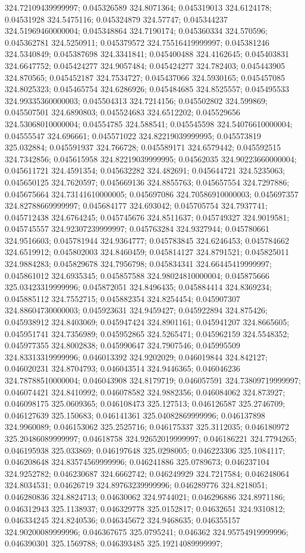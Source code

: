 324.72109439999997; 0.045326589 324.8071364; 0.045319013 324.6124178; 0.04531928 324.5475116; 0.045324879 324.57747; 0.045344237 324.51969460000004; 0.045348864 324.7190174; 0.045360334 324.570596; 0.045362781 324.5250911; 0.045379572 324.75516419999997; 0.045381246 324.5340849; 0.045387698 324.3341841; 0.045400488 324.4162645; 0.045403831 324.6647752; 0.045424277 324.9057484; 0.045424277 324.782403; 0.045443905 324.870565; 0.045452187 324.7534727; 0.045437066 324.5930165; 0.045457085 324.8025323; 0.045465754 324.6286926; 0.045484685 324.8525557; 0.045495533 324.99335360000003; 0.045504313 324.7214156; 0.045502802 324.599869; 0.045507501 324.6890803; 0.045524683 324.6512202; 0.045529656 324.53068010000004; 0.04554785 324.588541; 0.045545598 324.54076610000004; 0.04555547 324.696661; 0.045571022 324.82219039999995; 0.045573819 325.032884; 0.045591937 324.766728; 0.045589171 324.6579442; 0.045592515 324.7342856; 0.045615958 324.82219039999995; 0.04562035 324.90223660000004; 0.045611721 324.4591354; 0.045632282 324.482691; 0.045644721 324.5235063; 0.045650125 324.7620597; 0.045669136 324.8855763; 0.045657554 324.7297886; 0.045675664 324.73141610000005; 0.045697086 324.70586910000003; 0.045697357 324.82788669999997; 0.045684177 324.693042; 0.045705754 324.7937741; 0.045712438 324.6764245; 0.045745676 324.8511637; 0.045749327 324.9019581; 0.045745557 324.92307239999997; 0.045763284 324.9327944; 0.045780661 324.9516603; 0.045781944 324.9364777; 0.045783845 324.6246453; 0.045784662 324.6519912; 0.045802003 324.8460459; 0.045814127 324.8791521; 0.045825011 324.9884283; 0.045829678 324.7956798; 0.045834341 324.66445419999997; 0.045861012 324.6935345; 0.045857588 324.98024810000004; 0.045875666 325.03423319999996; 0.045872051 324.8496435; 0.045884414 324.8369234; 0.045885112 324.7552715; 0.045882354 324.8254454; 0.045907307 324.88604730000003; 0.045923631 324.9459427; 0.045922894 324.875426; 0.045938912 324.8403069; 0.045947424 324.8901161; 0.045941207 324.8665605; 0.045951741 324.7356989; 0.045952865 324.5265471; 0.045962159 324.5548352; 0.045977355 324.8002838; 0.045990647 324.7907546; 0.045995509 324.83313319999996; 0.046013392 324.9202029; 0.046019844 324.842127; 0.046020231 324.8704793; 0.046043514 324.9446365; 0.046046236 324.78788510000004; 0.046043908 324.8179719; 0.046057591 324.73809719999997; 0.046074421 324.8410992; 0.046078582 324.9882356; 0.046084062 324.873927; 0.046098175 325.0609365; 0.046108473 325.127513; 0.046126587 325.2746709; 0.046127639 325.150683; 0.046141361 325.04082869999996; 0.046137898 324.9960089; 0.046153062 325.2525716; 0.046175337 325.3112035; 0.046180972 325.20486089999997; 0.04618758 324.92652019999997; 0.046186221 324.7794265; 0.046195938 325.033869; 0.046197648 325.0298005; 0.046223306 325.1084117; 0.046208648 324.83574569999996; 0.046241886 325.0789673; 0.046237104 324.9252782; 0.046230687 324.6662742; 0.046249929 324.7217584; 0.046248064 324.8034531; 0.04626719 324.89763239999996; 0.046289776 324.8218051; 0.046280836 324.8824713; 0.04630062 324.9744021; 0.046296886 324.8971186; 0.046312943 325.1138937; 0.046329778 325.0152817; 0.04632651 324.9310812; 0.046334245 324.8240536; 0.046345672 324.9468635; 0.046355157 324.90200089999996; 0.046367675 325.0795241; 0.046362 324.95754919999996; 0.046390301 325.1569788; 0.046393485 325.19214089999997; 